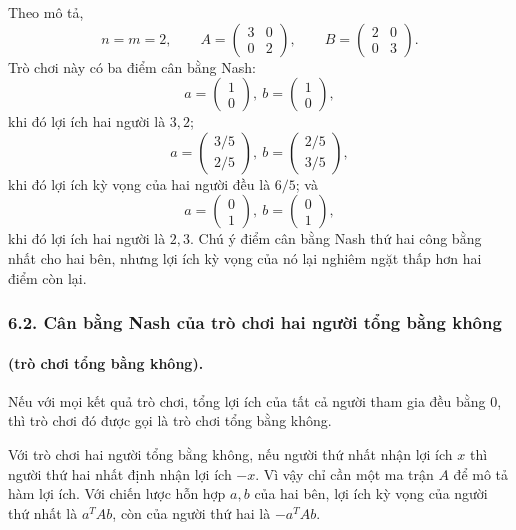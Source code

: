\documentclass[11pt]{article}
\begin{document}
Theo mô tả,
\[
  n=m=2,\qquad
  A=\begin{pmatrix}3&0\\0&2\end{pmatrix},\qquad
  B=\begin{pmatrix}2&0\\0&3\end{pmatrix}.
\]
Trò chơi này có ba điểm cân bằng Nash:
\[
  a=\begin{pmatrix}1\\0\end{pmatrix},\
  b=\begin{pmatrix}1\\0\end{pmatrix},
\]
khi đó lợi ích hai người là \(3,2\);
\[
  a=\begin{pmatrix}3/5\\2/5\end{pmatrix},\
  b=\begin{pmatrix}2/5\\3/5\end{pmatrix},
\]
khi đó lợi ích kỳ vọng của hai người đều là \(6/5\); và
\[
  a=\begin{pmatrix}0\\1\end{pmatrix},\
  b=\begin{pmatrix}0\\1\end{pmatrix},
\]
khi đó lợi ích hai người là \(2,3\). Chú ý điểm cân bằng Nash thứ hai công bằng
nhất cho hai bên, nhưng lợi ích kỳ vọng của nó lại nghiêm ngặt thấp hơn hai
điểm còn lại.

\subsubsection*{6.2. Cân bằng Nash của trò chơi hai người tổng bằng không}

\paragraph{ (trò chơi tổng bằng không).}
Nếu với mọi kết quả trò chơi, tổng lợi ích của tất cả người tham gia đều bằng
\(0\), thì trò chơi đó được gọi là trò chơi tổng bằng không.

Với trò chơi hai người tổng bằng không, nếu người thứ nhất nhận lợi ích \(x\)
thì người thứ hai nhất định nhận lợi ích \(-x\). Vì vậy chỉ cần một ma trận
\(A\) để mô tả hàm lợi ích. Với chiến lược hỗn hợp \(a,b\) của hai bên, lợi ích
kỳ vọng của người thứ nhất là \(a^TAb\), còn của người thứ hai là \(-a^TAb\).
\end{document}

